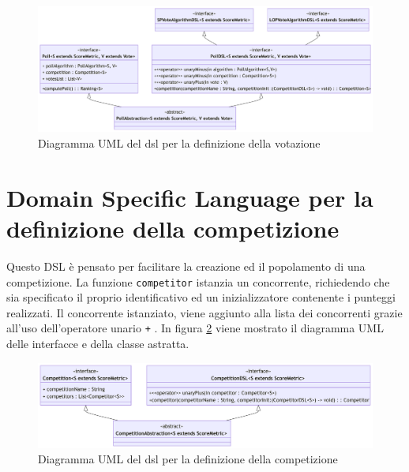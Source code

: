 \documentclass[12pt,a4paper,openright,twoside]{book}
\begin{document}
\vfill
\begin{center}
 \begin{figure}[H]
     \centering
      \includegraphics[width=1.1\linewidth]{figures/pollDSL.pdf}
      \caption{Diagramma UML del \ac{dsl} per la definizione della votazione}
     \label{fig:pollDSL}
  \end{figure}
\end{center}
\vfill
  



\section{Domain Specific Language per la definizione della competizione}
\label{dslcompetizione}
Questo DSL è pensato per facilitare la creazione ed il popolamento di una competizione.
La funzione \texttt{competitor} istanzia un concorrente,
richiedendo che sia specificato il proprio identificativo ed un inizializzatore contenente i punteggi realizzati.
Il concorrente istanziato, viene aggiunto alla lista dei concorrenti grazie all'uso dell'operatore unario \texttt{+} .
In figura \ref{fig:competitionDSL} viene mostrato il diagramma UML delle interfacce e della classe astratta.
\begin{figure}[H]
    \centering
     \includegraphics[width=1.1\linewidth]{figures/competitionDSL.pdf}
     \caption{Diagramma UML del \ac{dsl} per la definizione della competizione}
    \label{fig:competitionDSL}
 \end{figure}
 \newpage
\end{document}
